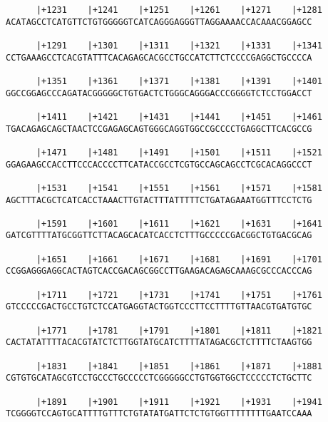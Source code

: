 \documentclass{article}
\begin{document}
\begin{Verbatim}
      |+1231    |+1241    |+1251    |+1261    |+1271    |+1281
ACATAGCCTCATGTTCTGTGGGGGTCATCAGGGAGGGTTAGGAAAACCACAAACGGAGCC
                                                            
      |+1291    |+1301    |+1311    |+1321    |+1331    |+1341
CCTGAAAGCCTCACGTATTTCACAGAGCACGCCTGCCATCTTCTCCCCGAGGCTGCCCCA
                                                            
      |+1351    |+1361    |+1371    |+1381    |+1391    |+1401
GGCCGGAGCCCAGATACGGGGGCTGTGACTCTGGGCAGGGACCCGGGGTCTCCTGGACCT
                                                            
      |+1411    |+1421    |+1431    |+1441    |+1451    |+1461
TGACAGAGCAGCTAACTCCGAGAGCAGTGGGCAGGTGGCCGCCCCTGAGGCTTCACGCCG
                                                            
      |+1471    |+1481    |+1491    |+1501    |+1511    |+1521
GGAGAAGCCACCTTCCCACCCCTTCATACCGCCTCGTGCCAGCAGCCTCGCACAGGCCCT
                                                            
      |+1531    |+1541    |+1551    |+1561    |+1571    |+1581
AGCTTTACGCTCATCACCTAAACTTGTACTTTATTTTTCTGATAGAAATGGTTTCCTCTG
                                                            
      |+1591    |+1601    |+1611    |+1621    |+1631    |+1641
GATCGTTTTATGCGGTTCTTACAGCACATCACCTCTTTGCCCCCGACGGCTGTGACGCAG
                                                            
      |+1651    |+1661    |+1671    |+1681    |+1691    |+1701
CCGGAGGGAGGCACTAGTCACCGACAGCGGCCTTGAAGACAGAGCAAAGCGCCCACCCAG
                                                            
      |+1711    |+1721    |+1731    |+1741    |+1751    |+1761
GTCCCCCGACTGCCTGTCTCCATGAGGTACTGGTCCCTTCCTTTTGTTAACGTGATGTGC
                                                            
      |+1771    |+1781    |+1791    |+1801    |+1811    |+1821
CACTATATTTTACACGTATCTCTTGGTATGCATCTTTTATAGACGCTCTTTTCTAAGTGG
                                                            
      |+1831    |+1841    |+1851    |+1861    |+1871    |+1881
CGTGTGCATAGCGTCCTGCCCTGCCCCCTCGGGGGCCTGTGGTGGCTCCCCCTCTGCTTC
                                                            
      |+1891    |+1901    |+1911    |+1921    |+1931    |+1941
TCGGGGTCCAGTGCATTTTGTTTCTGTATATGATTCTCTGTGGTTTTTTTTGAATCCAAA
                                                            

\end{Verbatim}
\end{document}
